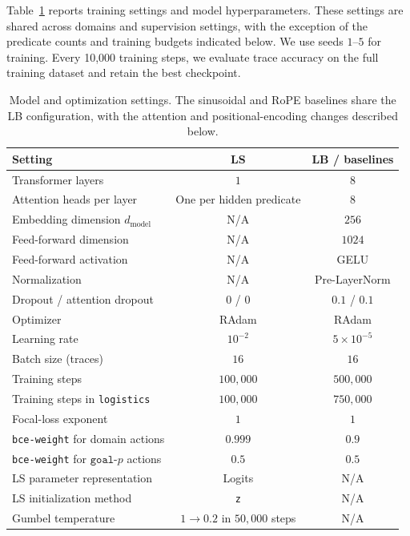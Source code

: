 Table~\ref{tab:model-hyperparameters} reports training settings and model hyperparameters.
These settings are shared across domains and supervision settings,
with the exception of the predicate counts and training budgets indicated below.
We use seeds $1$--$5$ for training.
Every 10,000 training steps, we evaluate trace accuracy on the full training
dataset and retain the best checkpoint.

\begin{table}[!ht]
\centering
\caption{Model and optimization settings. The sinusoidal and RoPE baselines
share the LB configuration, with the attention and positional-encoding changes
described below.}
\label{tab:model-hyperparameters}
\small
\setlength{\tabcolsep}{5pt}
\begin{tabular}{@{}lcc@{}}
\toprule
Setting & LS & LB / baselines \\
\midrule
Transformer layers & $1$ & $8$ \\
Attention heads per layer & One per hidden predicate & $8$ \\
Embedding dimension $d_\text{model}$ & N/A & $256$ \\
Feed-forward dimension & N/A & $1024$ \\
Feed-forward activation & N/A & GELU \\
Normalization & N/A & Pre-LayerNorm \\
Dropout / attention dropout & $0$ / $0$ & $0.1$ / $0.1$ \\
\midrule
Optimizer & RAdam & RAdam \\
Learning rate & $10^{-2}$ & $5\times10^{-5}$ \\
Batch size (traces) & $16$ & $16$ \\
Training steps & $100{,}000$ & $500{,}000$ \\
Training steps in \texttt{logistics} & $100{,}000$ & $750{,}000$ \\
Focal-loss exponent & $1$ & $1$ \\
\texttt{bce-weight} for domain actions & $0.999$ & $0.9$ \\
\texttt{bce-weight} for $\texttt{goal-}p$ actions & $0.5$ & $0.5$ \\
\midrule
LS parameter representation & Logits & N/A \\
LS initialization method & \texttt{z} & N/A \\
Gumbel temperature & $1\rightarrow0.2$ in $50{,}000$ steps & N/A \\
\bottomrule
\end{tabular}
\end{table}

